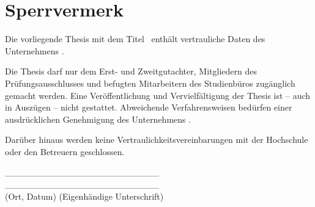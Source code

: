 \newpage
\thispagestyle{empty}
\section*{Sperrvermerk}
Die vorliegende Thesis mit dem Titel \glqq \myTitel\grqq\ enthält vertrauliche Daten des Unternehmens \myFirma.

Die Thesis darf nur dem Erst- und Zweitgutachter, Mitgliedern des Prüfungsausschlusses und befugten Mitarbeitern des Studienbüros zugänglich gemacht werden. Eine Veröffentlichung und Vervielfältigung der Thesis ist -- auch in Auszügen -- nicht gestattet. Abweichende Verfahrensweisen bedürfen einer ausdrücklichen Genehmigung des Unternehmens \myFirma .

Darüber hinaus werden keine Vertraulichkeitsvereinbarungen mit der Hochschule oder den Betreuern geschlossen.

\par\medskip
\par\medskip

\_\_\_\_\_\_\_\_\_\_\_\_\_\_\_\_\_\_\_\_\_\_\_\_ \hspace{1.5cm} \_\_\_\_\_\_\_\_\_\_\_\_\_\_\_\_\_\_\_\_\_\_\_\_ \\
(Ort, Datum)\hspace{6,2cm}
(Eigenhändige Unterschrift)

\newpage
